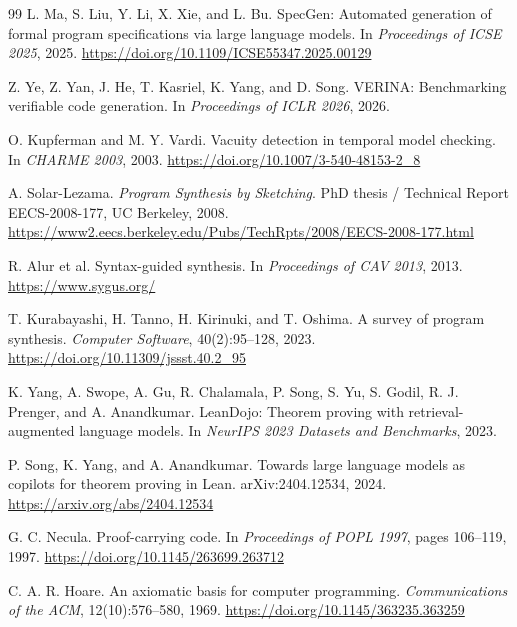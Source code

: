 \begin{thebibliography}{99}
L. Ma, S. Liu, Y. Li, X. Xie, and L. Bu.
\newblock SpecGen: Automated generation of formal program specifications via large
language models.
\newblock In \emph{Proceedings of ICSE 2025}, 2025.
\newblock \url{https://doi.org/10.1109/ICSE55347.2025.00129}

Z. Ye, Z. Yan, J. He, T. Kasriel, K. Yang, and D. Song.
\newblock VERINA: Benchmarking verifiable code generation.
\newblock In \emph{Proceedings of ICLR 2026}, 2026.

O. Kupferman and M. Y. Vardi.
\newblock Vacuity detection in temporal model checking.
\newblock In \emph{CHARME 2003}, 2003.
\newblock \url{https://doi.org/10.1007/3-540-48153-2_8}

A. Solar-Lezama.
\newblock \emph{Program Synthesis by Sketching}.
\newblock PhD thesis / Technical Report EECS-2008-177, UC Berkeley, 2008.
\newblock \url{https://www2.eecs.berkeley.edu/Pubs/TechRpts/2008/EECS-2008-177.html}

R. Alur et al.
\newblock Syntax-guided synthesis.
\newblock In \emph{Proceedings of CAV 2013}, 2013.
\newblock \url{https://www.sygus.org/}

T. Kurabayashi, H. Tanno, H. Kirinuki, and T. Oshima.
\newblock A survey of program synthesis.
\newblock \emph{Computer Software}, 40(2):95--128, 2023.
\newblock \url{https://doi.org/10.11309/jssst.40.2_95}

K. Yang, A. Swope, A. Gu, R. Chalamala, P. Song, S. Yu, S. Godil, R. J. Prenger, and
A. Anandkumar.
\newblock LeanDojo: Theorem proving with retrieval-augmented language models.
\newblock In \emph{NeurIPS 2023 Datasets and Benchmarks}, 2023.

P. Song, K. Yang, and A. Anandkumar.
\newblock Towards large language models as copilots for theorem proving in Lean.
\newblock arXiv:2404.12534, 2024.
\newblock \url{https://arxiv.org/abs/2404.12534}

G. C. Necula.
\newblock Proof-carrying code.
\newblock In \emph{Proceedings of POPL 1997}, pages 106--119, 1997.
\newblock \url{https://doi.org/10.1145/263699.263712}

C. A. R. Hoare.
\newblock An axiomatic basis for computer programming.
\newblock \emph{Communications of the ACM}, 12(10):576--580, 1969.
\newblock \url{https://doi.org/10.1145/363235.363259}


\end{thebibliography}
